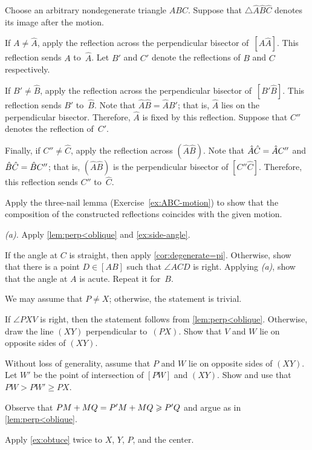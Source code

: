 Choose an arbitrary nondegenerate triangle $ABC$.
Suppose that $\triangle \hat A \hat B\hat C$ denotes its image after the motion.

If $A\ne \hat A$, apply the reflection across the perpendicular bisector of~$[A\hat A]$.
This reflection sends $A$ to~$\hat A$.
Let $B'$ and $C'$ denote the reflections of $B$ and $C$ respectively.

If $B'\ne \hat B$, apply the reflection across the perpendicular bisector of~$[B'\hat B]$.
This reflection sends $B'$ to~$\hat B$.
Note that $\hat A\hat B=\hat AB'$;
that is, $\hat A$ lies on the perpendicular bisector. 
Therefore, $\hat A$ is fixed by this reflection.
Suppose that $C''$ denotes the reflection of~$C'$.

Finally, if $C''\ne \hat C$, apply the reflection across $(\hat A\hat B)$.
Note that $\hat A\hat C\z=\hat AC''$ and $\hat B\hat C\z=\hat BC''$;
that is, $(\hat A\hat B)$ is the perpendicular bisector of $[C''\hat C]$.
Therefore, this reflection sends $C''$ to~$\hat C$.

Apply the three-nail lemma (Exercise~\ref{ex:ABC-motion}) to show that the composition of the constructed reflections coincides with the given motion.

\textit{(a).} Apply \ref{lem:perp<oblique} and \ref{ex:side-angle}.

 If the angle at $C$ is straight, then apply \ref{cor:degenerate=pi}.
Otherwise, show that there is a point $D\in [AB]$ such that $\angle ACD$ is right.
Applying \textit{(a)}, show that the angle at $A$ is acute.
Repeat it for~$B$.

We may assume that $P \ne X$; otherwise, the statement is trivial.

If $\angle PXV$ is right, then the statement follows from \ref{lem:perp<oblique}.
Otherwise, draw the line $(XY)$ perpendicular to~$(PX)$.
Show that $V$ and $W$ lie on opposite sides of $(XY)$.

Without loss of generality, assume that $P$ and $W$ lie on opposite sides of $(XY)$.
Let $W'$ be the point of intersection of $[PW]$ and $(XY)$.
Show and use that $PW>PW'\ge PX$.

Observe that $PM+MQ=P'M+MQ\z\ge P'Q$ and argue as in \ref{lem:perp<oblique}.



Apply \ref{ex:obtuce} twice to $X$, $Y$, $P$, and the center.

